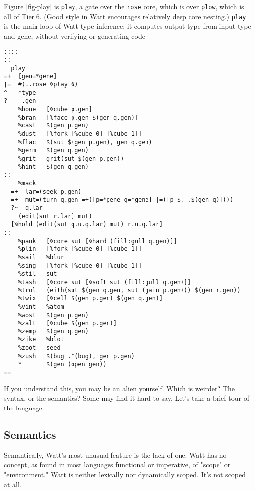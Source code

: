 \documentclass[10pt, nocopyrightspace]{sigplanconf}
\begin{document}
Figure \ref{fig-play} is \verb|play|, a gate over the \verb|rose| core,
which is over \verb|plow|, which is all of Tier 6.  (Good style
in Watt encourages relatively deep core nesting.)  \verb|play| is
the main loop of Watt type inference; it computes output type
from input type and gene, without verifying or generating code.

\begin{figure*}[ht]
\begin{center}
\makebox[\textwidth]{\hrulefill}
\begin{verbatim}
::::
::
  play
=+  [gen=*gene]
|=  #(..rose %play 6)
^-  *type
?-  -.gen
    %bone   [%cube p.gen]
    %bran   [%face p.gen $(gen q.gen)]
    %cast   $(gen p.gen)
    %dust   [%fork [%cube 0] [%cube 1]]
    %flac   $(sut $(gen p.gen), gen q.gen)
    %germ   $(gen q.gen)
    %grit   grit(sut $(gen p.gen))
    %hint   $(gen q.gen)
:: 
    %mack 
  =+  lar=(seek p.gen)
  =+  mut=(turn q.gen =+([p=*gene q=*gene] |=([p $.-.$(gen q)])))
  ?~  q.lar
    (edit(sut r.lar) mut)
  [%hold (edit(sut q.u.q.lar) mut) r.u.q.lar]
:: 
    %pank   [%core sut [%hard (fill:gull q.gen)]]
    %plin   [%fork [%cube 0] [%cube 1]]
    %sail   %blur
    %sing   [%fork [%cube 0] [%cube 1]]
    %stil   sut
    %tash   [%core sut [%soft sut (fill:gull q.gen)]]
    %trol   (eith(sut $(gen q.gen, sut (gain p.gen))) $(gen r.gen))
    %twix   [%cell $(gen p.gen) $(gen q.gen)]
    %vint   %atom
    %wost   $(gen p.gen)
    %zalt   [%cube $(gen p.gen)]
    %zemp   $(gen q.gen)
    %zike   %blot
    %zoot   seed
    %zush   $(bug .^(bug), gen p.gen)
    *       $(gen (open gen))
==
\end{verbatim}
\end{center}
\caption{play.rose.plow}
\label{fig-play}
\end{figure*}

If you understand this, you may be an alien yourself.  Which is
weirder?  The syntax, or the semantics?  Some may find it hard to
say.  Let's take a brief tour of the language.

\subsection{Semantics}

Semantically, Watt's most unusual feature is the lack of one.
Watt has no concept, as found in most languages functional or
imperative, of "scope" or "environment."  Watt is neither
lexically nor dynamically scoped.  It's not scoped at all.
\end{document}
